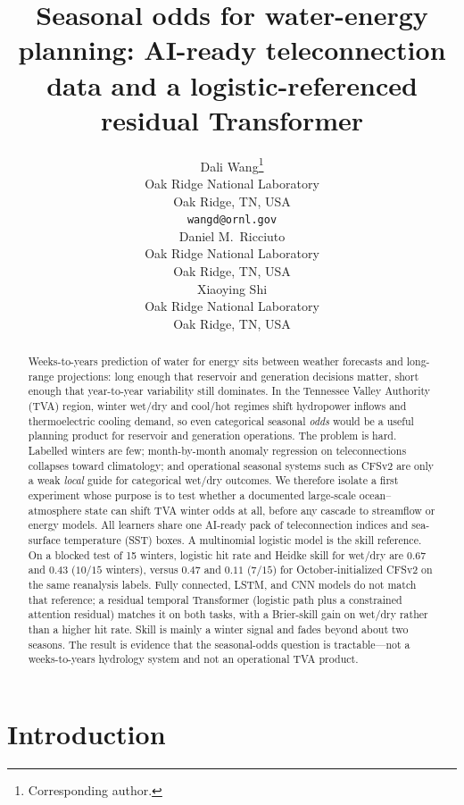\documentclass{article}
\title{Seasonal odds for water-energy planning: AI-ready teleconnection data and a logistic-referenced residual Transformer}
\author{%
  Dali Wang\thanks{Corresponding author.} \\
  Oak Ridge National Laboratory \\
  Oak Ridge, TN, USA \\
  \texttt{wangd@ornl.gov} \\
  \And
  Daniel M.~Ricciuto \\
  Oak Ridge National Laboratory \\
  Oak Ridge, TN, USA \\
  \AND
  Xiaoying Shi \\
  Oak Ridge National Laboratory \\
  Oak Ridge, TN, USA 
}
\begin{document}
\maketitle

\begin{abstract}
Weeks-to-years prediction of water for energy sits between weather forecasts and long-range projections: long enough that reservoir and generation decisions matter, short enough that year-to-year variability still dominates. In the Tennessee Valley Authority (TVA) region, winter wet/dry and cool/hot regimes shift hydropower inflows and thermoelectric cooling demand, so even categorical seasonal \emph{odds} would be a useful planning product for reservoir and generation operations. The problem is hard. Labelled winters are few; month-by-month anomaly regression on teleconnections collapses toward climatology; and operational seasonal systems such as CFSv2 are only a weak \emph{local} guide for categorical wet/dry outcomes. We therefore isolate a first experiment whose purpose is to test whether a documented large-scale ocean--atmosphere state can shift TVA winter odds at all, before any cascade to streamflow or energy models. All learners share one AI-ready pack of teleconnection indices and sea-surface temperature (SST) boxes. A multinomial logistic model is the skill reference. On a blocked test of 15 winters, logistic hit rate and Heidke skill for wet/dry are \(0.67\) and \(0.43\) (\(10/15\) winters), versus \(0.47\) and \(0.11\) (\(7/15\)) for October-initialized CFSv2 on the same reanalysis labels. Fully connected, LSTM, and CNN models do not match that reference; a residual temporal Transformer (logistic path plus a constrained attention residual) matches it on both tasks, with a Brier-skill gain on wet/dry rather than a higher hit rate. Skill is mainly a winter signal and fades beyond about two seasons. The result is evidence that the seasonal-odds question is tractable---not a weeks-to-years hydrology system and not an operational TVA product.
\end{abstract}

\section{Introduction}
\end{document}
